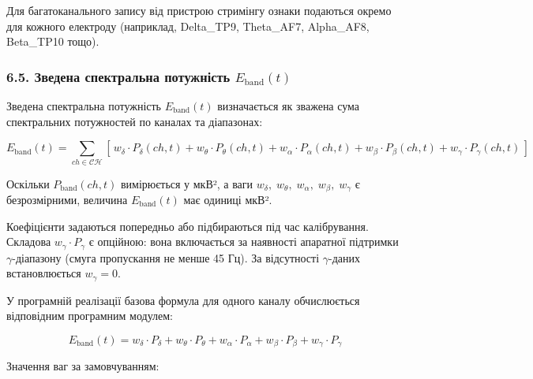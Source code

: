 \documentclass[12pt,a4paper]{article}
\begin{document}
Для багатоканального запису від пристрою стримінгу ознаки подаються окремо для кожного електроду (наприклад, Delta\_TP9, Theta\_AF7, Alpha\_AF8, Beta\_TP10 тощо).



\subsubsection{\texorpdfstring{6.5. Зведена спектральна потужність \(E_{\text{band}}(t)\)}{6.5. Зведена спектральна потужність E\_\{\textbackslash text\{band\}\}(t)}}\label{ux437ux432ux435ux434ux435ux43dux430-ux441ux43fux435ux43aux442ux440ux430ux43bux44cux43dux430-ux43fux43eux442ux443ux436ux43dux456ux441ux442ux44c-e_textbandt}



Зведена спектральна потужність \(E_{\text{band}}(t)\) визначається як зважена сума спектральних потужностей по каналах та діапазонах:



\[E_{\text{band}}(t) = \sum_{ch \in \mathcal{CH}} \left[\,w_\delta \cdot P_\delta(ch,t) + w_\theta \cdot P_\theta(ch,t) + w_\alpha \cdot P_\alpha(ch,t) + w_\beta \cdot P_\beta(ch,t) + w_\gamma \cdot P_\gamma(ch,t)\,\right]\]



Оскільки \(P_{\text{band}}(ch, t)\) вимірюється у мкВ², а ваги \(w_\delta,\;w_\theta,\;w_\alpha,\;w_\beta,\;w_\gamma\) є безрозмірними, величина \(E_{\text{band}}(t)\) має одиниці мкВ².



Коефіцієнти задаються попередньо або підбираються під час калібрування. Складова \(w_\gamma \cdot P_\gamma\) є опційною: вона включається за наявності апаратної підтримки \(\gamma\)-діапазону (смуга пропускання не менше 45 Гц). За відсутності \(\gamma\)-даних встановлюється \(w_\gamma = 0\).



У програмній реалізації базова формула для одного каналу обчислюється відповідним програмним модулем:



\[E_{\text{band}}(t) = w_\delta \cdot P_\delta + w_\theta \cdot P_\theta + w_\alpha \cdot P_\alpha + w_\beta \cdot P_\beta + w_\gamma \cdot P_\gamma\]



Значення ваг за замовчуванням:
\end{document}
